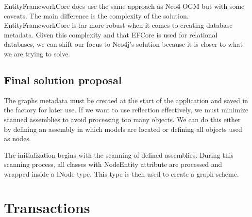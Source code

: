 EntityFrameworkCore does use the same approach as Neo4-OGM but with some caveats. The main difference is the complexity of the solution. EntityFrameworkCore is far more robust when it comes to creating database metadata. Given this complexity and that EFCore is used for relational databases, we can shift our focus to Neo4j's solution because it is closer to what we are trying to solve.

\subsection{Final solution proposal}

The graphs metadata must be created at the start of the application and saved in the factory for later use.
If we want to use reflection effectively, we must minimize scanned assemblies to avoid processing too many objects.
We can do this either by defining an assembly in which models are located or defining all objects used as nodes.

The initialization begins with the scanning of defined assemblies. During this scanning process, all classes with NodeEntity attribute are processed and wrapped inside
a INode type. This type is then used to create a graph scheme.

\section{Transactions}
